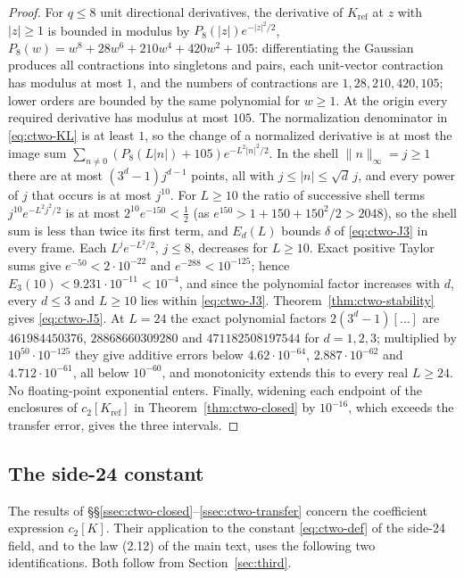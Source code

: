 \begin{proof}
For $q\le8$ unit directional derivatives, the derivative of $K_{\mathrm{ref}}$ at $z$ with $|z|\ge1$ is bounded in modulus by $P_8(|z|)e^{-|z|^2/2}$, $P_8(w)=w^8+28w^6+210w^4+420w^2+105$: differentiating the Gaussian produces all contractions into singletons and pairs, each unit-vector contraction has modulus at most $1$, and the numbers of contractions are $1,28,210,420,105$; lower orders are bounded by the same polynomial for $w\ge1$. At the origin every required derivative has modulus at most $105$. The normalization denominator in \eqref{eq:ctwo-KL} is at least $1$, so the change of a normalized derivative is at most the image sum $\sum_{n\ne0}(P_8(L|n|)+105)e^{-L^2|n|^2/2}$. In the shell $\|n\|_\infty=j\ge1$ there are at most $(3^d-1)j^{d-1}$ points, all with $j\le|n|\le\sqrt d\,j$, and every power of $j$ that occurs is at most $j^{10}$. For $L\ge10$ the ratio of successive shell terms $j^{10}e^{-L^2j^2/2}$ is at most $2^{10}e^{-150}<\frac12$ (as $e^{150}>1+150+150^2/2>2048$), so the shell sum is less than twice its first term, and $E_d(L)$ bounds $\delta$ of \eqref{eq:ctwo-J3} in every frame. Each $L^je^{-L^2/2}$, $j\le8$, decreases for $L\ge10$. Exact positive Taylor sums give $e^{-50}<2\cdot10^{-22}$ and $e^{-288}<10^{-125}$; hence $E_3(10)<9.231\cdot10^{-11}<10^{-4}$, and since the polynomial factor increases with $d$, every $d\le3$ and $L\ge10$ lies within \eqref{eq:ctwo-J3}. Theorem~\ref{thm:ctwo-stability} gives \eqref{eq:ctwo-J5}. At $L=24$ the exact polynomial factors $2(3^d-1)[\dots]$ are $461984450376$, $28868660309280$ and $471182508197544$ for $d=1,2,3$; multiplied by $10^{50}\cdot10^{-125}$ they give additive errors below $4.62\cdot10^{-64}$, $2.887\cdot10^{-62}$ and $4.712\cdot10^{-61}$, all below $10^{-60}$, and monotonicity extends this to every real $L\ge24$. No floating-point exponential enters. Finally, widening each endpoint of the enclosures of $c_2[K_{\mathrm{ref}}]$ in Theorem~\ref{thm:ctwo-closed} by $10^{-16}$, which exceeds the transfer error, gives the three intervals.
\end{proof}

\subsection{The side-24 constant}\label{ssec:ctwo-side24}

The results of \S\S\ref{ssec:ctwo-closed}--\ref{ssec:ctwo-transfer} concern the coefficient expression $c_2[K]$. Their application to the constant \eqref{eq:ctwo-def} of the side-24 field, and to the law (2.12) of the main text, uses the following two identifications. Both follow from Section~\ref{sec:third}.


